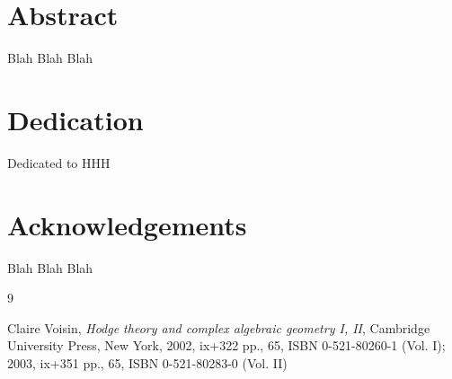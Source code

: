 \documentclass{article}
\begin{document}
\chapter*{Abstract}
\begin{doublespace}
Blah Blah Blah
\end{doublespace}


\newpage

\chapter*{Dedication}
\bigskip

\centerline{Dedicated to HHH}

\newpage

\chapter*{Acknowledgements}
Blah Blah Blah


\newpage





\fontsize{11}{20pt} \selectfont  


\begin{doublespacing}
	










\end{doublespacing}


\begin{thebibliography}{9}

Claire Voisin, \emph{Hodge theory and complex algebraic geometry I, II},  Cambridge
University Press, New York, 2002, ix+322 pp.,  65, ISBN 0-521-80260-1 (Vol. I);
2003, ix+351 pp.,  65, ISBN 0-521-80283-0 (Vol. II)

\end{thebibliography}
\end{document}
